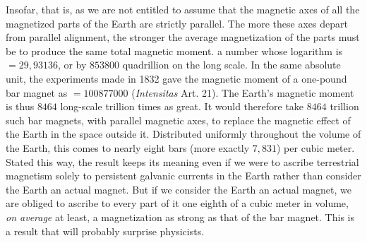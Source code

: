 \expandafter\def\csname HistoricalNoteText21\endcsname{Insofar, that is, as we are not entitled to assume that the magnetic axes of all the magnetized parts of the Earth are strictly parallel. The more these axes depart from parallel alignment, the stronger the average magnetization of the parts must be to produce the same total magnetic moment.}
a number whose logarithm is $=29{,}93136$, or by $853800$ quadrillion on the long scale. In the same absolute unit, the experiments made in 1832 gave the magnetic moment of a one-pound bar magnet as $=100877000$ (\textit{Intensitas} Art. 21). The Earth's magnetic moment is thus $8464$ long-scale trillion times as great. It would therefore take $8464$ trillion such bar magnets, with parallel magnetic axes, to replace the magnetic effect of the Earth in the space outside it. Distributed uniformly throughout the volume of the Earth, this comes to nearly eight bars (more exactly $7{,}831$) per cubic meter. Stated this way, the result keeps its meaning even if we were to ascribe terrestrial magnetism solely to persistent galvanic currents in the Earth rather than consider the Earth an actual magnet. But if we consider the Earth an actual magnet, we are obliged to ascribe to every part of it one eighth of a cubic meter in volume, \textit{on average} at least, a magnetization as strong as that of the bar magnet. This is a result that will probably surprise physicists.


